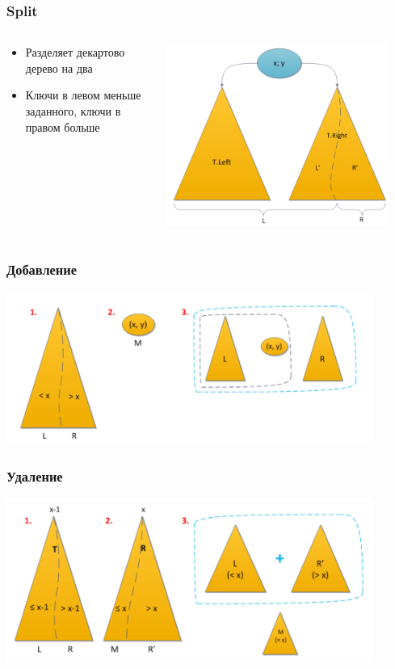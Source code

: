 \documentclass[xetex,mathserif,serif]{beamer}
\begin{document}
	\begin{frame}
		\frametitle{Split}
		\begin{columns}
			\begin{column}{0.4\textwidth}
				\begin{itemize}
					\item Разделяет декартово дерево на два
					\item Ключи в левом меньше заданного, ключи в правом больше
				\end{itemize}
			\end{column}
			\begin{column}{0.6\textwidth}
				\begin{center}
					\includegraphics[width=0.9\textwidth]{treap-split.png}
				\end{center}
			\end{column}
		\end{columns}
	\end{frame}

	\begin{frame}
		\frametitle{Добавление}
		\begin{center}
			\includegraphics[width=0.9\textwidth]{treap-add.png}
		\end{center}
	\end{frame}

	\begin{frame}
		\frametitle{Удаление}
		\begin{center}
			\includegraphics[width=0.9\textwidth]{treap-remove.png}
		\end{center}
	\end{frame}
\end{document}
